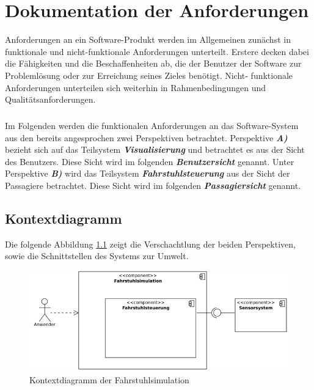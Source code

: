 \chapter{Dokumentation der Anforderungen}
Anforderungen an ein Software-Produkt werden im Allgemeinen zunächst in funktionale und nicht-funktionale Anforderungen unterteilt. Erstere decken dabei die Fähigkeiten und die Beschaffenheiten ab, die der Benutzer der Software zur Problemlösung oder zur Erreichung seines Zieles benötigt. Nicht- funktionale Anforderungen unterteilen sich weiterhin in Rahmenbedingungen und Qualitätsanforderungen.

\paragraph{}
Im Folgenden werden die funktionalen Anforderungen an das Software-System aus den bereits angesprochen zwei Perspektiven betrachtet. Perspektive \textit{\textbf{A)}} bezieht sich auf das Teilsystem \textit{\textbf{\gls{Visualisierung}}} und betrachtet es aus der Sicht des Benutzers. Diese Sicht wird im folgenden \textit{\textbf{Benutzersicht}} genannt. Unter Perspektive \textit{\textbf{B)}} wird das Teilsystem \textit{\textbf{\gls{Fahrstuhlsteuerung}}} aus der Sicht der Passagiere betrachtet. Diese Sicht wird im folgenden \textit{\textbf{Passagiersicht}} genannt.

\newpage
\section{Kontextdiagramm}
Die folgende Abbildung \ref{fig:Kontextdiagramm} zeigt die Verschachtlung der beiden Perspektiven, sowie die Schnittstellen des Systems zur Umwelt.

\vspace{0,5cm}

\begin{figure}[hbt]
	\includegraphics[width=\textwidth]{images/Kontextdiagramm.png}
	\caption{Kontextdiagramm der \gls{Fahrstuhlsimulation}}
	\label{fig:Kontextdiagramm}
\end{figure}

